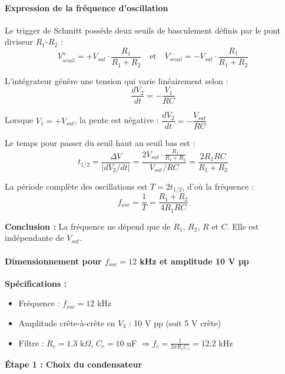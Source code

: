 \documentclass[11pt,a4paper]{article}
\begin{document}
\paragraph{Expression de la fréquence d'oscillation}

Le trigger de Schmitt possède deux seuils de basculement définis par le pont diviseur $R_1$-$R_2$ :
\begin{equation}
V_{seuil}^+ = +V_{sat} \cdot \frac{R_1}{R_1 + R_2} \quad \text{et} \quad V_{seuil}^- = -V_{sat} \cdot \frac{R_1}{R_1 + R_2}
\end{equation}

L'intégrateur génère une tension qui varie linéairement selon :
\begin{equation}
\frac{dV_2}{dt} = -\frac{V_1}{RC}
\end{equation}

Lorsque $V_1 = +V_{sat}$, la pente est négative : $\dfrac{dV_2}{dt} = -\dfrac{V_{sat}}{RC}$

Le temps pour passer du seuil haut au seuil bas est :
\begin{equation}
t_{1/2} = \frac{\Delta V}{|dV_2/dt|} = \frac{2V_{sat} \cdot \frac{R_1}{R_1+R_2}}{V_{sat}/RC} = \frac{2R_1 RC}{R_1+R_2}
\end{equation}

La période complète des oscillations est $T = 2t_{1/2}$, d'où la fréquence :
\begin{equation}
\boxed{f_{osc} = \frac{1}{T} = \frac{R_1 + R_2}{4 R_1 RC}}
\end{equation}

\textbf{Conclusion :} La fréquence ne dépend que de $R_1$, $R_2$, $R$ et $C$. Elle est indépendante de $V_{sat}$.

\paragraph{Dimensionnement pour $f_{osc} = 12$ kHz et amplitude 10 V pp}

\textbf{Spécifications :}
\begin{itemize}
    \item Fréquence : $f_{osc} = 12$ kHz
    \item Amplitude crête-à-crête en $V_3$ : 10 V pp (soit 5 V crête)
    \item Filtre : $R_c = 1.3$ k$\Omega$, $C_c = 10$ nF $\Rightarrow f_c = \frac{1}{2\pi R_c C_c} = 12.2$ kHz
\end{itemize}

\textbf{Étape 1 : Choix du condensateur}
\end{document}
